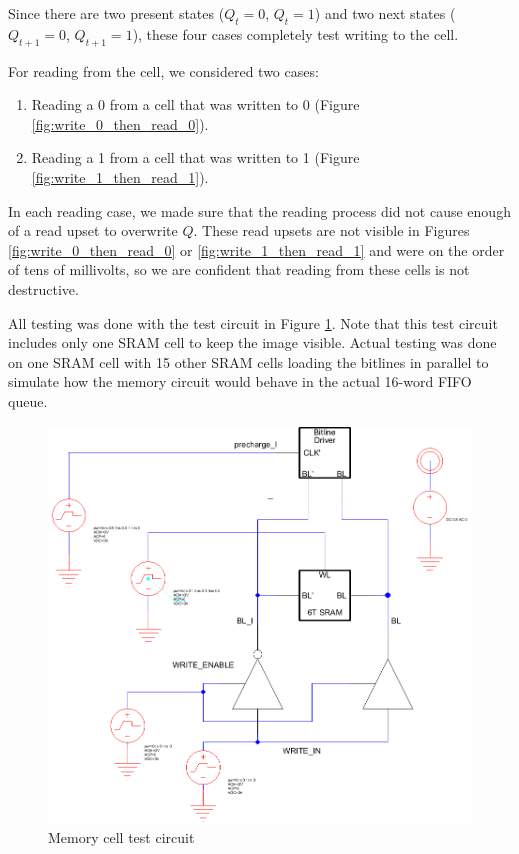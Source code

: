 \documentclass[12pt]{report}
\begin{document}
Since there are two present states ($Q_t = 0$, $Q_t = 1$) and two next states ($Q_{t+1} = 0$, $Q_{t+1} = 1$), these four cases completely test writing to the cell.

For reading from the cell, we considered two cases:
\begin{enumerate}
\item Reading a 0 from a cell that was written to 0 (Figure \ref{fig:write_0_then_read_0}).
\item Reading a 1 from a cell that was written to 1 (Figure \ref{fig:write_1_then_read_1}).
\end{enumerate}

In each reading case, we made sure that the reading process did not cause enough of a read upset to overwrite $Q$. These read upsets are not visible in Figures \ref{fig:write_0_then_read_0} or \ref{fig:write_1_then_read_1} and were on the order of tens of millivolts, so we are confident that reading from these cells is not destructive.

All testing was done with the test circuit in Figure \ref{fig:test_circuit}. Note that this test circuit includes only one SRAM cell to keep the image visible. Actual testing was done on one SRAM cell with 15 other SRAM cells loading the bitlines in parallel to simulate how the memory circuit would behave in the actual 16-word FIFO queue.

\begin{figure}[H]
  \centering
    \includegraphics[width=1.0\textwidth]{test_circuit.png}
  \caption{Memory cell test circuit}
  \label{fig:test_circuit}
\end{figure}
\end{document}
